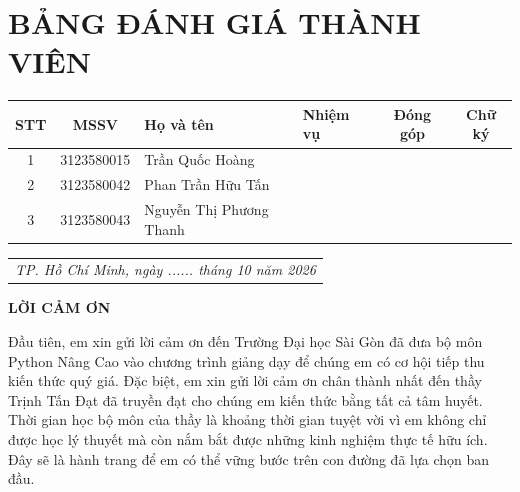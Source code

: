 \documentclass[a4paper,13pt]{extarticle}
\begin{document}
\newpage
\thispagestyle{empty} 
\section*{BẢNG ĐÁNH GIÁ THÀNH VIÊN}

\begin{center}
    \normalsize
    \renewcommand{\arraystretch}{1.6} %
    \begin{tabularx}{\textwidth}{|c|c|l|X|c|c|}
        \hline
        \textbf{STT} & \textbf{MSSV} & \textbf{Họ và tên} & \textbf{Nhiệm vụ} & \textbf{Đóng góp} & \textbf{Chữ ký} \\ \hline
        
        1 & 3123580015 & Trần Quốc Hoàng & & & \\ \hline
        
        2 & 3123580042 & Phan Trần Hữu Tấn & & & \\ \hline
        
        3 & 3123580043 & Nguyễn Thị Phương Thanh & & & \\ \hline
    \end{tabularx}
\end{center}


\vspace{1.5cm}
\begin{flushright}
    \begin{tabular}{@{}c@{}}
        \textit{TP. Hồ Chí Minh, ngày ...... tháng 10 năm 2026} \\[0.5cm]
    
    \end{tabular}
\end{flushright}


\newpage
\thispagestyle{empty}

\begin{center}
    {\fontsize{16}{20}\selectfont \textbf{LỜI CẢM ƠN}}\\[0.5cm]
\end{center}

\fontsize{13}{15}\selectfont
Đầu tiên, em xin gửi lời cảm ơn đến Trường Đại học Sài Gòn đã đưa bộ môn Python Nâng Cao vào chương trình giảng dạy để chúng em có cơ hội tiếp thu kiến thức quý giá. Đặc biệt, em xin gửi lời cảm ơn chân thành nhất đến thầy Trịnh Tấn Đạt đã truyền đạt cho chúng em kiến thức bằng tất cả tâm huyết. Thời gian học bộ môn của thầy là khoảng thời gian tuyệt vời vì em không chỉ được học lý thuyết mà còn nắm bắt được những kinh nghiệm thực tế hữu ích. Đây sẽ là hành trang để em có thể vững bước trên con đường đã lựa chọn ban đầu.
\end{document}
